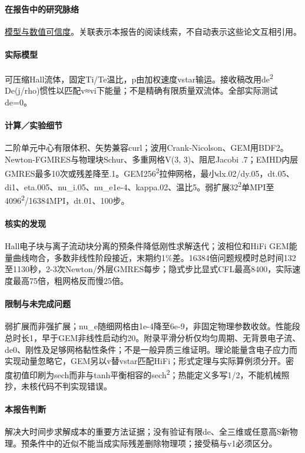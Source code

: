 \paragraph{在报告中的研究脉络}\hyperref[ch:numerics]{模型与数值可信度}。关联表示本报告的阅读线索，不自动表示这些论文互相引用。

\paragraph{实际模型}可压缩Hall流体，固定Ti/Te温比，p由加权速度vstar输运。接收稿改用de\textsuperscript{2} De(j/rho)惯性以匹配v≈vi下能量；不是精确有限质量双流体。全部实际测试de=0。

\paragraph{计算／实验细节}二阶单元中心有限体积、矢势兼容curl；波用Crank-Nicolson、GEM用BDF2。Newton-FGMRES与物理块Schur、多重网格V(3, 3)、阻尼Jacobi .7；EMHD内层GMRES最多10次或残差降至.1。GEM256\textsuperscript{2}拉伸网格，最小dx.02/dy.05，dt.05、di1、eta.005、nu\_i.05、nu\_e1e-4、kappa.02、温比5。弱扩展32\textsuperscript{2}单MPI至4096\textsuperscript{2}/16384MPI，dt.01、100步。

\paragraph{核实的发现}Hall电子块与离子流动块分离的预条件降低刚性求解迭代；波相位和HiFi GEM能量曲线吻合，多数非线性阶段接近，末期约1\%差。16384倍问题规模时总时间132至1130秒，2-3次Newton/外层GMRES每步；隐式步比显式CFL最高8400，实际速度最高75倍，粗网格反而慢25倍。

\paragraph{限制与未完成问题}弱扩展而非强扩展；nu\_e随细网格由1e-4降至6e-9，非固定物理参数收敛。性能段总时长1，早于GEM非线性启动约20。附录平滑分析仅均匀周期、无背景电子流、de0、刚性及足够网格黏性条件；不是一般异质三维证明。理论能量含电子应力而实现动量忽略它，GEM另以v替vstar匹配HiFi；形式定理与实际算例须分开。密度初值印刷为sech而非与tanh平衡相容的sech\textsuperscript{2}；热能定义多写1/2，不能机械照抄，未核代码不判实现错误。

\paragraph{本报告判断}解决大时间步求解成本的重要方法证据；没有验证有限de、全三维或任意高S新物理。预条件中的近似不能当成实际残差删除物理项；接受稿与v1必须区分。

